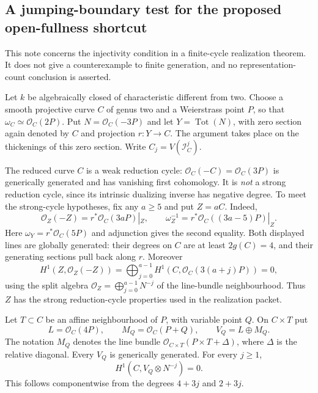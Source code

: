 \subsection*{A jumping-boundary test for the proposed open-fullness shortcut}

This note concerns the injectivity condition in a finite-cycle
realization theorem. It does not give a counterexample to finite
generation, and no representation-count conclusion is asserted.

Let $k$ be algebraically closed of characteristic different from two.
Choose a smooth projective curve $C$ of genus two and a Weierstrass
point $P$, so that $\omega_C\simeq\mathcal O_C(2P)$.
Put $N=\mathcal O_C(-3P)$ and let $Y=\operatorname{Tot}(N)$,
with zero section again denoted by $C$ and projection $r:Y\to C$.
The argument takes place on the thickenings of this zero section.
Write $C_j=V(\mathcal I_C^j)$.

The reduced curve $C$ is a weak reduction cycle:
$\mathcal O_C(-C)=\mathcal O_C(3P)$ is generically generated and
has vanishing first cohomology. It is \emph{not} a strong reduction
cycle, since its intrinsic dualizing inverse has negative degree.
To meet the strong-cycle hypotheses, fix any $a\geq5$ and put
$Z=aC$. Indeed,
\[
 \mathcal O_Z(-Z)=r^*\mathcal O_C(3aP)|_Z,
 \qquad
 \omega_Z^{-1}=r^*\mathcal O_C((3a-5)P)|_Z.
\]
Here $\omega_Y=r^*\mathcal O_C(5P)$ and adjunction gives the
second equality. Both displayed lines are globally generated:
their degrees on $C$ are at least $2g(C)=4$, and their generating
sections pull back along $r$. Moreover
\[
 H^1(Z,\mathcal O_Z(-Z))
   =\bigoplus_{j=0}^{a-1}H^1(C,\mathcal O_C(3(a+j)P))=0,
\]
using the split algebra
$\mathcal O_Z=\bigoplus_{j=0}^{a-1}N^{-j}$ of the line-bundle
neighbourhood. Thus $Z$ has the strong reduction-cycle properties
used in the realization packet.

Let $T\subset C$ be an affine neighbourhood of $P$, with variable
point $Q$. On $C\times T$ put
\[
 L=\mathcal O_C(4P),\qquad
 M_Q=\mathcal O_C(P+Q),\qquad V_Q=L\oplus M_Q.
\]
The notation $M_Q$ denotes the line bundle
$\mathcal O_{C\times T}(P\times T+\Delta)$, where $\Delta$
is the relative diagonal. Every $V_Q$ is generically generated.
For every $j\geq1$,
\[
                 H^1(C,V_Q\otimes N^{-j})=0.              \tag{B.NO.1}
\]
This follows componentwise from the degrees $4+3j$ and $2+3j$.

